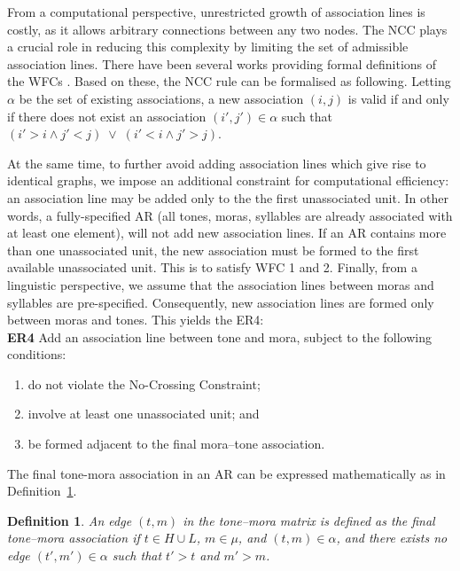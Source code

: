 \documentclass{CUP-JNL-PHO}%
\theoremstyle{definition}
\numberwithin{equation}{section}
\theoremstyle{definition}
\newtheorem{definition}{Definition}[section]
\begin{document}
From a computational perspective, unrestricted growth of association lines is costly, as it allows arbitrary connections between any two nodes. %
The NCC plays a crucial role in reducing this complexity by limiting the 
set of admissible association lines. There have been several works 
providing formal definitions of the WFCs \citep{goldsmith1976autosegmental, 
	coleman1991no, jardine2015concatenation, jardine2017LocalNature}. 
Based on these, the NCC rule can be formalised as following. Letting \(\alpha\) be the set of existing associations, a new association \((i,j)\) is valid if 
and only if there does not exist an association \((i',j') \in \alpha\) such 
that \( (i' > i \wedge j' < j) \;\vee\; (i' < i \wedge j' > j)\). 

At the same time, to further avoid adding association lines which give
rise to identical graphs, we impose an additional constraint for
computational efficiency: an association line may be added only to the
the first unassociated unit. In other words, a fully-specified AR (all tones, moras, syllables are already associated with at least one element), will not add new association lines. If an AR contains more than one unassociated unit,
the new association must be formed to the first available unassociated
unit. This is to satisfy WFC 1 and 2. Finally, from a linguistic
perspective, we assume that the association lines between moras and
syllables are pre-specified. Consequently, new association lines are
formed only between moras and tones. This yields the ER4:\\

\noindent \textbf{ER4} Add an association line between tone and mora, subject to the following conditions:
	\begin{enumerate}[label = \alph*.]
		\setlength\itemsep{0em}
		\setlength\parskip{0em}
		\setlength{\parindent}{1em}
		\item do not violate the No-Crossing Constraint;
		\item involve at least one unassociated unit; and
		\item be formed adjacent to the final mora--tone association.\label{er4}
	\end{enumerate}

The final tone-mora association in an AR can be expressed 
mathematically as in Definition~\ref{def.finaltonemora}.

\begin{definition}
	\label{def.finaltonemora}
	\textit{An edge $(t,m)$ in the tone--mora matrix is defined as the 
		\emph{final} tone--mora association if $t \in H \cup L$, $m \in 
		\mu$, and $(t,m) \in \alpha$, and there exists no edge $(t',m') \in
		\alpha$ such that $t' > t$ and $m' > m$.}
\end{definition} 
\end{document}
